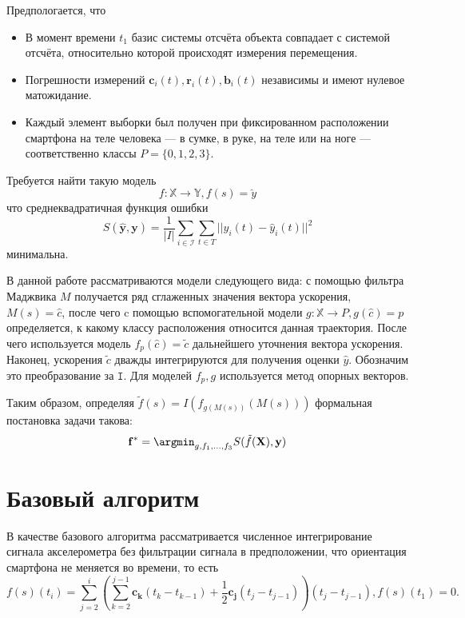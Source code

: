 \documentclass[12pt,twoside]{article}
\begin{document}
Предпологается, что
\begin{itemize}
    \item В момент времени $t_1$ базис системы отсчёта объекта совпадает с системой отсчёта, относительно которой происходят измерения перемещения.
    \item Погрешности измерений $\mathbf{c}_i(t), \mathbf{r}_i(t), \mathbf{b}_i(t)$ независимы и имеют нулевое матожидание.
    \item Каждый элемент выборки был получен при фиксированном расположении смартфона на теле человека --- в сумке, в руке, на теле или на ноге 
    --- соответственно классы $ P = \{0, 1, 2, 3 \} $.
\end{itemize}

Требуется найти такую модель 
$$ 
f: \mathbb{X} \rightarrow \mathbb{Y}, f(s) = \hat{y} 
$$
что среднеквадратичная функция ошибки 
$$
    S(\hat{\mathbf{y}}, \mathbf{y}) = \frac{1}{|I|} \sum\limits_{i \in \mathcal{I}} \sum\limits_{t \in T} || y_i(t) - \hat{y}_i(t) ||^2
$$ 
минимальна.

В данной работе рассматриваются модели следующего вида:
с помощью фильтра Маджвика $M$ получается ряд сглаженных значения вектора ускорения, $M(s) = \hat{c} $, после чего c помощью вспомогательной
модели $g: \mathbb{X} \rightarrow P, g(\hat{c}) = p$ определяется, к какому классу расположения относится данная траектория. После чего
используется модель $f_p(\hat{c}) = \tilde{c} $ дальнейшего уточнения вектора ускорения. Наконец, ускорения $\tilde{c}$ дважды интегрируются для 
получения оценки $\hat{y}$. Обозначим это преобразование за $\mathtt{I}$. Для моделей $f_p, g$ используется метод опорных векторов.

Таким образом, определяя $\tilde{f}(s) = I(f_{g(M(s))}(M(s)))$ формальная постановка задачи такова:
$$
    \mathbf{f}^* = \argmin_{g, f_1, \ldots, f_3 } S(\tilde{f}(\mathbf{X}), \mathbf{y})
$$

\section{Базовый алгоритм}

В качестве базового алгоритма рассматривается численное интегрирование сигнала акселерометра 
без фильтрации сигнала в предположении, что ориентация смартфона не меняется во времени, то есть
$$
    f(s)(t_i) = \sum\limits_{j=2}^{i}(\sum\limits_{k=2}^{j - 1} \mathbf{c_k} (t_k - t_{k - 1}) + \frac{1}{2}\mathbf{c_j} (t_j - t_{j - 1})) (t_j - t_{j - 1}), f(s)(t_1) = 0.
$$
\end{document}
